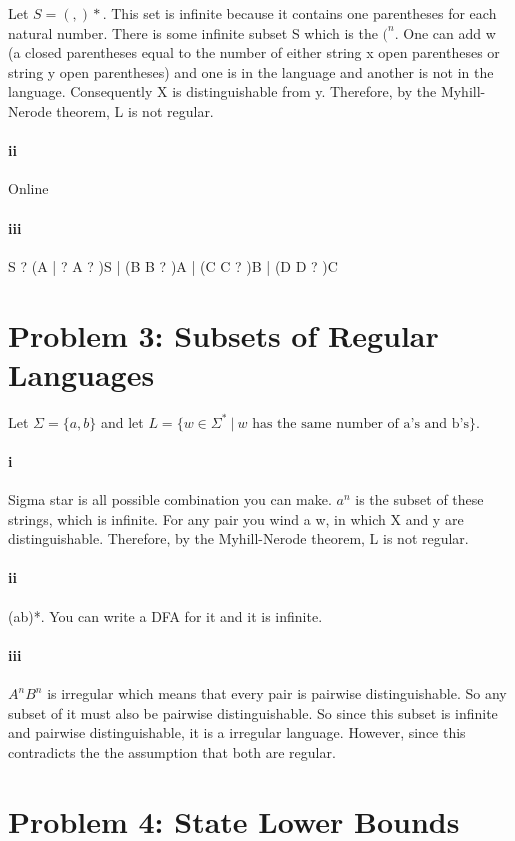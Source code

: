 \documentclass[10pt,letter]{article}
\begin{document}
\proof Let $S = (,)*.$ This set is infinite because it contains one parentheses for each natural number. There is some infinite subset S which is the $(^n$. One can add w (a closed parentheses equal to the number of either string x open parentheses or string y open parentheses) and one is in the language and another is not in the language.  Consequently X is distinguishable from y. Therefore, by the Myhill-Nerode theorem, L is not regular. 

\paragraph{ii}
Online

\paragraph{iii}
S ? (A | ?
A ? )S | (B
B ? )A | (C
C ? )B | (D
D ? )C

\section*{Problem 3: Subsets of Regular Languages}
Let $\Sigma = \{a, b\}$ and let $L = \{ w \in \Sigma^* \ | \ w \text{ has the same number of a's and b's} \}$. 
\paragraph{i} 

\proof Sigma star is all possible combination you can make. $a^n$ is the subset of these strings, which is infinite. For any pair you wind a w, in which  X and y are distinguishable. Therefore, by the Myhill-Nerode theorem, L is not regular. 

\paragraph{ii}
(ab)*. You can write a DFA for it and it is infinite. 

\paragraph{iii}
$A^nB^n$ is irregular which means that every pair is pairwise distinguishable. So any subset of it must also be pairwise distinguishable. So since this subset is infinite and pairwise distinguishable, it is a irregular language. However, since this contradicts the the assumption that both are regular. 

\section*{Problem 4: State Lower Bounds}
\end{document}
